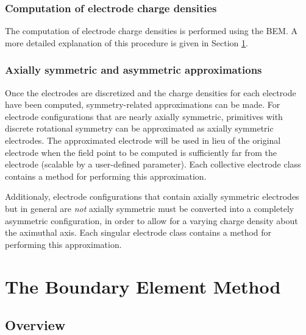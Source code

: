 \documentclass[11pt,a4paper,oneside]{article}
\begin{document}
\subsubsection{Computation of electrode charge densities}
\label{subsubsec:computationOfChargeDensities}

The computation of electrode charge densities is performed using the BEM.  A more detailed explanation of this procedure is given in Section \ref{sec:BEM}.

\subsubsection{Axially symmetric and asymmetric approximations}
\label{subsubsec:symApproximations}

Once the electrodes are discretized and the charge densities for each electrode have been computed, symmetry-related approximations can be made.  For electrode configurations that are nearly axially symmetric, primitives with discrete rotational symmetry can be approximated as axially symmetric electrodes.  The approximated electrode will be used in lieu of the original electrode when the field point to be computed is sufficiently far from the electrode (scalable by a user-defined parameter).  Each collective electrode class contains a method for performing this approximation.  

Additionaly, electrode configurations that contain axially symmetric electrodes but in general are {\it not} axially symmetric must be converted into a completely asymmetric configuration, in order to allow for a varying charge density about the aximuthal axis.  Each singular electrode class contains a method for performing this approximation.  

\section{The Boundary Element Method}
\label{sec:BEM}

\subsection{Overview}
\label{subsec:BEMOverview}
\end{document}
